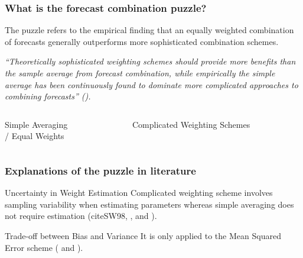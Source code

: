 \begin{frame}
\frametitle{What is the forecast combination puzzle?}

    The puzzle refers to the empirical finding that an equally weighted combination of forecasts generally outperforms more sophisticated combination schemes.

    \vspace{5mm}

    \textit{“Theoretically sophisticated weighting schemes should provide more benefits than the sample average from forecast combination, while empirically the simple average has been continuously found to dominate more complicated approaches to combining forecasts” (\cite{WHLK22}).}

        \begin{columns}[t]
    \begin{column}{0.4\textwidth}
        \begin{block}{}
        \centering
        Simple Averaging \\
        / Equal Weights
        \end{block}
    \end{column}
    
    \begin{column}{0.5\textwidth}
        \begin{block}{}
        \centering
        Complicated Weighting Schemes
        \end{block}
    \end{column}
    \end{columns}
    
\end{frame}


\begin{frame}
    \frametitle{Explanations of the puzzle in literature}

        \begin{exampleblock}{\Large{Uncertainty in Weight Estimation}}
        Complicated weighting scheme involves sampling variability when estimating parameters whereas simple averaging does not require estimation (cite{SW98}, \cite{SW04}, and \cite{SW09}).
        \end{exampleblock}

        \vspace{5mm}

        \begin{exampleblock}{\Large{Trade-off between Bias and Variance}}
        It is only applied to the Mean Squared Error scheme (\cite{E11} and \cite{CMVW16}).
        \end{exampleblock}

\end{frame}



